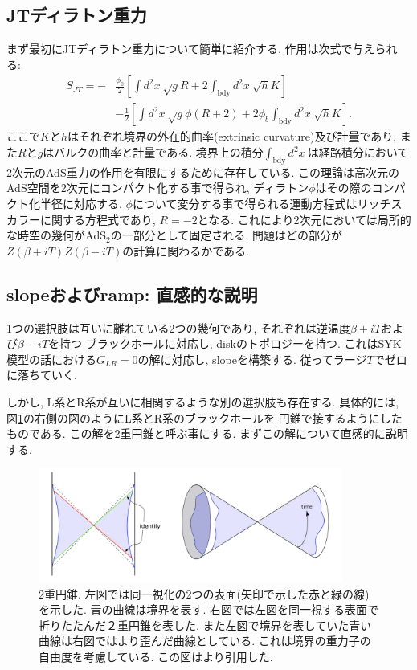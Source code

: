 \subsection{JTディラトン重力}
まず最初にJTディラトン重力について簡単に紹介する. 
作用は次式で与えられる:
\begin{align}
	S_{JT} = -&\frac{\phi_0}{2}\left[\int d^2x\ \sqrt{g}R + 2\int_{\mathrm{bdy}} d^2x\ \sqrt{h}K \right]
			\nonumber\\
			&-\frac{1}{2}\left[
				\int d^2x\ \sqrt{g}\phi(R+2) + 2\phi_b\int_{\mathrm{bdy}}d^2x\ \sqrt{h}K
			\right].
	\label{eq:JTgravity}
\end{align}
ここで$K$と$h$はそれぞれ境界の外在的曲率(extrinsic curvature)及び計量であり,
また$R$と$g$はバルクの曲率と計量である.
境界上の積分$\int_{\mathrm{bdy}} d^2x\ $は経路積分において
2次元のAdS重力の作用を有限にするために存在している.
この理論は高次元のAdS空間を2次元にコンパクト化する事で得られ,
ディラトン$\phi$はその際のコンパクト化半径に対応する. 
$\phi$について変分する事で得られる運動方程式はリッチスカラーに関する方程式であり, $R = -2$となる. 
これにより2次元においては局所的な時空の幾何が$\mathrm{AdS}_2$の一部分として固定される. 
問題はどの部分が$Z(\beta + iT)Z(\beta - iT)$の計算に関わるかである. 

\subsection{slopeおよびramp: 直感的な説明}
1つの選択肢は互いに離れている2つの幾何であり, それぞれは逆温度$\beta + iT$および$\beta - iT$を持つ
ブラックホールに対応し, diskのトポロジーを持つ. 
これはSYK模型の話における$G_{LR} = 0$の解に対応し, slopeを構築する. 
従ってラージ$T$でゼロに落ちていく. 

しかし, L系とR系が互いに相関するような別の選択肢も存在する. 
具体的には, 図\ref{fig:double_cone}の右側の図のようにL系とR系のブラックホールを
円錐で接するようにしたものである. この解を2重円錐と呼ぶ事にする. 
まずこの解について直感的に説明する. 

\begin{figure}[ht]
	\centering
	\includegraphics[width=10cm]{figures/double_cone}
	\caption{
	2重円錐. 左図では同一視化の2つの表面(矢印で示した赤と緑の線)を示した. 
	青の曲線は境界を表す. 
	右図では左図を同一視する表面で折りたたんだ２重円錐を表した. 
	また左図で境界を表していた青い曲線は右図ではより歪んだ曲線としている. 
	これは境界の重力子の自由度を考慮している. 
	この図は\cite{stanford_chaos}より引用した. }
	\label{fig:double_cone}
\end{figure}

